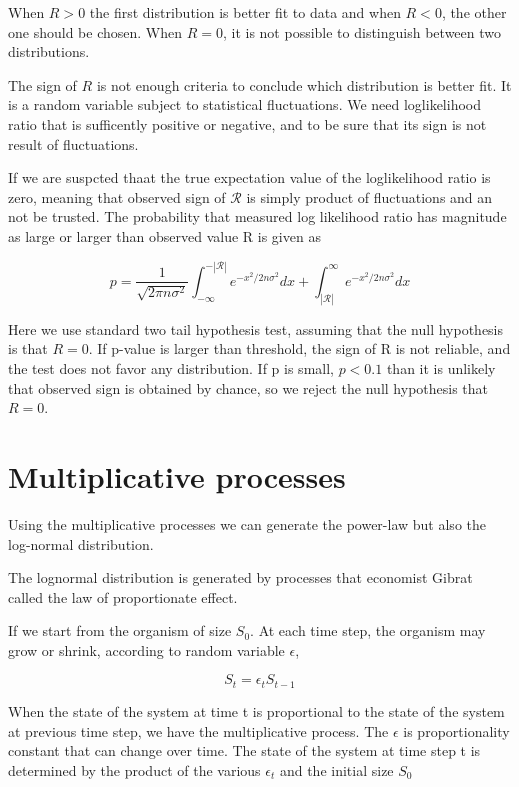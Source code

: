 When $R>0$ the first distribution is better fit to data and when $R<0$, the other one should be chosen. When $R=0$, it is not possible to distinguish between two distributions. 

The sign of $R$ is not enough criteria to conclude which distribution is better fit. It is a random variable subject to statistical fluctuations. We need loglikelihood ratio that is sufficently positive or negative, and to be sure that its sign is not result of fluctuations.

If we are suspcted thaat the true expectation value of the loglikelihood ratio is zero, meaning that observed sign of $\mathcal{R}$ is simply product of fluctuations and an not be trusted. The probability that measured log likelihood ratio has magnitude as large or larger than observed value R is given as

\begin{equation}
p = \frac{1}{\sqrt{2\pi n \sigma^2}} \int_{-\infty}^{-|\mathcal{R}|}e^{-x^2/2n\sigma^2}dx + \int_{|\mathcal{R}|}^{\infty}e^{-x^2/2n\sigma^2}dx
\end{equation}

Here we use standard two tail hypothesis test, assuming that the null hypothesis is that $R= 0$. If p-value is larger than threshold, the sign of R is not reliable, and the test does not favor any distribution. If p is small, $p<0.1$ than it is unlikely that observed sign is obtained by chance, so we reject the null hypothesis that $R=0$. 

\section{Multiplicative processes}

Using the multiplicative processes we can generate the power-law but also the log-normal distribution. 

The lognormal distribution is generated by processes that economist Gibrat called the law of proportionate effect. 

If we start from the organism of size $S_0$. At each time step, the organism may grow or shrink,  according to random variable $\epsilon$, 

$$S_t = \epsilon_t S_{t-1}$$   

When the state of the system at time t is proportional to the state of the system at previous time step, we have the multiplicative process. The $\epsilon$ is proportionality constant that can change over time. The state of the system at time step t is determined by the product of the various $\epsilon_t$ and the initial size $S_0$ 

